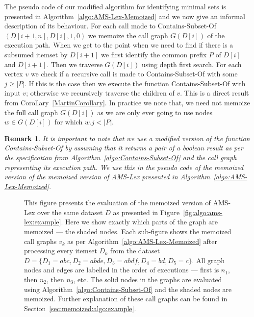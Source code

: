 \documentclass[13pt,a4paper]{article}
\newtheorem{remark}[theorem]{Remark}
\begin{document}
The pseudo code of our modified algorithm for identifying minimal sets is presented in Algorithm~\ref{algo:AMS-Lex-Memoized} and we now give an informal description of its behaviour. 
For each call made to Contains-Subset-Of$(D[i + 1, n], D[i], 1, 0)$ we memoize the call graph $G(D[i])$ of the execution path.
When we get to the point when we need to find if there is a subsumed itemset by $D[i+1]$ we first identify the common prefix $P$ of $D[i]$ and $D[i + 1]$.
Then we traverse $G(D[i])$ using depth first search. For each vertex $v$ we check if a recursive call is made to Contains-Subset-Of with some $j \geq \vert P \vert$.
If this is the case then we execute the function Contains-Subset-Of with input $v$; otherwise we recursively traverse the children of $v$. This is a direct result from Corollary~\ref{MartinCorollary}. In practice we note that, we need not memoize the full call graph $G(D[i])$ as we are only ever going to use nodes $w \in G(D[i])$ for which $w.j < |P|$.

\begin{remark}
It is important to note that we use a modified version of the function Contains-Subset-Of by assuming that it returns a pair of a boolean result as per the specification from Algorithm~\ref{algo:Contains-Subset-Of} and the call graph representing its execution path. We use this in the pseudo code of the memoized version of the memoized version of AMS-Lex presented in Algorithm~\ref{algo:AMS-Lex-Memoized}.
\end{remark}


\begin{figure} [t]
	\centering
	\caption{ This figure presents the evaluation of the memoized version of AMS-Lex over the same dataset $D$ as presented in Figure~\ref{fig:algo:ams-lex:example}. Here we show exactly which parts of the graph are memoized --- the shaded nodes. Each sub-figure shows the memoized call graphs $v_k$ as per Algorithm~\ref{algo:AMS-Lex-Memoized} after processing every itemset $D_k$ from the dataset $D = \{ D_1 = abc, D_2 = abde, D_3 = abdf, D_4 = bd, D_5 = c \}$. All graph nodes and edges are labelled in the order of executions --- first is $n_1$, then $n_2$, then $n_3$, etc. The solid nodes in the graphs are evaluated using Algorithm~\ref{algo:Contains-Subset-Of} and the shaded nodes are memoized. Further explanation of these call graphs can be found in Section~\ref{sec:memoized:algo:example}. }
	\label{fig:algo:memoized:example}
\end{figure}
\end{document}

